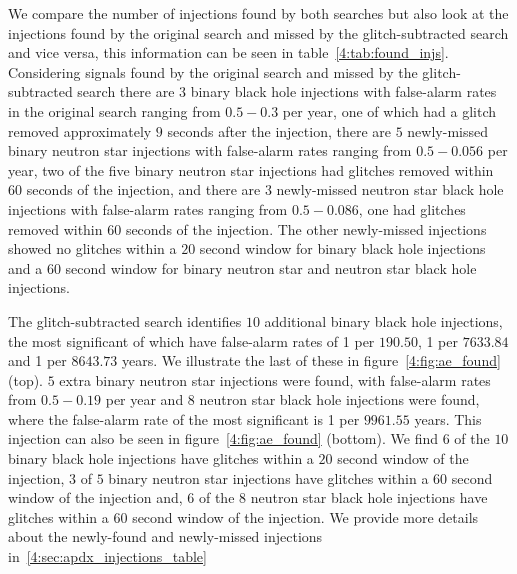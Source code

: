 We compare the number of injections found by both searches but also look at the \gw{} injections found by the original search and missed by the glitch-subtracted search and vice versa, this information can be seen in table~\ref{4:tab:found_injs}. Considering signals found by the original search and missed by the glitch-subtracted search there are $3$ binary black hole injections with false-alarm rates in the original search ranging from $0.5 - 0.3$ per year, one of which had a glitch removed approximately $9$ seconds after the injection, there are $5$ newly-missed binary neutron star injections with false-alarm rates ranging from $0.5 - 0.056$ per year, two of the five binary neutron star injections had glitches removed within $60$ seconds of the injection, and there are $3$ newly-missed neutron star black hole injections with false-alarm rates ranging from $0.5 - 0.086$, one had glitches removed within $60$ seconds of the injection. The other newly-missed injections showed no \scl{} glitches within a $20$ second window for binary black hole injections and a $60$ second window for binary neutron star and neutron star black hole injections.

The glitch-subtracted search identifies $10$ additional binary black hole injections, the most significant of which have false-alarm rates of 1 per $190.50$, 1 per $7633.84$ and 1 per $8643.73$ years. We illustrate the last of these in figure~\ref{4:fig:ae_found} (top). $5$ extra binary neutron star injections were found, with false-alarm rates from $0.5 - 0.19$ per year and $8$ neutron star black hole injections were found, where the false-alarm rate of the most significant is 1 per $9961.55$ years. This injection can also be seen in figure~\ref{4:fig:ae_found} (bottom). We find $6$ of the $10$ binary black hole injections have \scl{} glitches within a $20$ second window of the injection, $3$ of $5$ binary neutron star injections have \scl{} glitches within a $60$ second window of the injection and, $6$ of the $8$ neutron star black hole injections have \scl{} glitches within a $60$ second window of the injection. We provide more details about the newly-found and newly-missed injections in~\ref{4:sec:apdx_injections_table}

